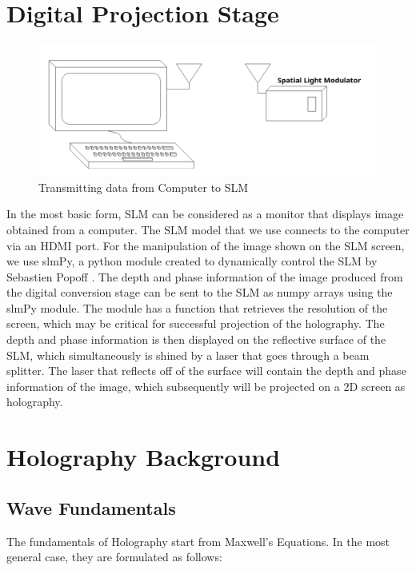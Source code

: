 \documentclass[12pt]{article}
\begin{document}
\newpage
\section{Digital Projection Stage}

\begin{figure}
    \centering
    \includegraphics[width=\textwidth]{transmission}
    \caption{Transmitting data from Computer to SLM}
    \label{fig:my_label}
\end{figure}

In the most basic form, SLM can be considered as a monitor that displays image obtained from a computer. The SLM model that we use connects to the computer via an HDMI port. For the manipulation of the image shown on the SLM screen, we use slmPy, a python module created to dynamically control the SLM by Sebastien Popoff \cite{slmPy}. The depth and phase information of the image produced from the digital conversion stage can be sent to the SLM as numpy arrays using the slmPy module. The module has a function that retrieves the resolution of the screen, which may be critical for successful projection of the holography. The depth and phase information is then displayed on the reflective surface of the SLM, which simultaneously is shined by a laser that goes through a beam splitter. The laser that reflects off of the surface will contain the depth and phase information of the image, which subsequently will be projected on a 2D screen as holography.


\section{Holography Background}

\subsection{Wave Fundamentals}

The fundamentals of Holography start from Maxwell's Equations. In the most general case, they are formulated as follows:
\end{document}
